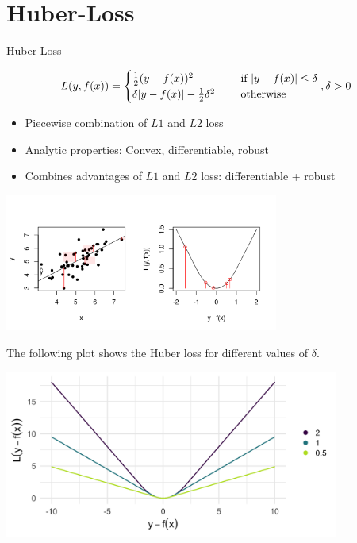 \section{Huber-Loss}


\begin{vbframe}{Huber-Loss}

\vspace*{-0.3cm}

$$
L(y, f(x)) = \begin{cases}
  \frac{1}{2}(y - f(x))^2  & \text{ if } |y - f(x)| \le \delta \\
  \delta |y - f(x)|-\frac{1}{2}\delta^2 \quad & \text{ otherwise }
  \end{cases}, \delta > 0
$$

\begin{itemize}
\item Piecewise combination of $L1$ and $L2$ loss
\item Analytic properties: Convex, differentiable, robust
\item Combines advantages of $L1$ and $L2$ loss: differentiable + robust
\end{itemize}

\vspace*{-1cm}

\begin{center}
\includegraphics[width = 9cm]{figure_man/loss_huber_plot1.png} \\
\end{center}

\framebreak

The following plot shows the Huber loss for different values of $\delta$.

\begin{center}
\includegraphics[width = 11cm]{figure_man/loss_huber_plot2.png} 
\end{center}

\end{vbframe}

